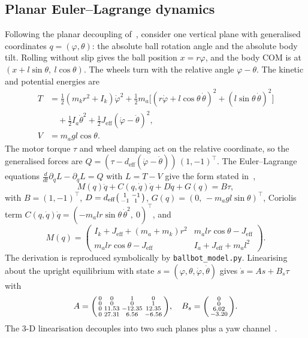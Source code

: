 \documentclass[conference]{IEEEtran}
\theoremstyle{remark}
\begin{document}
\subsection{Planar Euler--Lagrange dynamics}
Following the planar decoupling of~\cite{nagarajan2014,fankhauser2010}, consider one vertical plane with generalised coordinates $q=(\varphi,\theta)$: the absolute ball rotation angle and the absolute body tilt. Rolling without slip gives the ball position $x=r\varphi$, and the body COM is at $(x+l\sin\theta,\ l\cos\theta)$. The wheels turn with the relative angle $\varphi-\theta$. The kinetic and potential energies are
\begin{align}
T &= \tfrac12(m_k r^2+I_k)\dot\varphi^2 + \tfrac12 m_a\big[(r\dot\varphi+l\cos\theta\,\dot\theta)^2+(l\sin\theta\,\dot\theta)^2\big]\nonumber\\
&\quad+\tfrac12 I_a\dot\theta^2 + \tfrac12 J_{\mathrm{eff}}(\dot\varphi-\dot\theta)^2,\\
V &= m_a g l\cos\theta.
\end{align}
The motor torque $\tau$ and wheel damping act on the relative coordinate, so the generalised forces are $Q=(\tau-d_{\mathrm{eff}}(\dot\varphi-\dot\theta))\,(1,-1)^{\!\top}$. The Euler--Lagrange equations $\frac{d}{dt}\partial_{\dot q}L-\partial_q L=Q$ with $L=T-V$ give the form stated in~\cite{tadesse2025report},
\begin{equation}
M(q)\ddot q + C(q,\dot q)\dot q + D\dot q + G(q) = B\tau,\label{eq:eom}
\end{equation}
with $B=(1,-1)^{\!\top}$, $D=d_{\mathrm{eff}}\begin{psmallmatrix}1&-1\\-1&1\end{psmallmatrix}$, $G(q)=(0,\,-m_a g l\sin\theta)^{\!\top}$, Coriolis term $C(q,\dot q)\dot q=(-m_a l r\sin\theta\,\dot\theta^2,\ 0)^{\!\top}$, and
\begin{equation}
M(q)=\begin{pmatrix}
I_k+J_{\mathrm{eff}}+(m_a+m_k)r^2 & m_a l r\cos\theta-J_{\mathrm{eff}}\\
m_a l r\cos\theta-J_{\mathrm{eff}} & I_a+J_{\mathrm{eff}}+m_a l^2
\end{pmatrix}.\label{eq:M}
\end{equation}
The derivation is reproduced symbolically by \texttt{ballbot\_model.py}. Linearising about the upright equilibrium with state $s=(\varphi,\theta,\dot\varphi,\dot\theta)$ gives $\dot s=As+B_s\tau$ with
\begin{equation}
A=\begin{psmallmatrix}0&0&1&0\\0&0&0&1\\0&11.53&-12.35&12.35\\0&27.31&6.56&-6.56\end{psmallmatrix},\quad
B_s=\begin{psmallmatrix}0\\0\\6.02\\-3.20\end{psmallmatrix}.
\end{equation}
The 3-D linearisation decouples into two such planes plus a yaw channel~\cite{nagarajan2014}.
\end{document}

